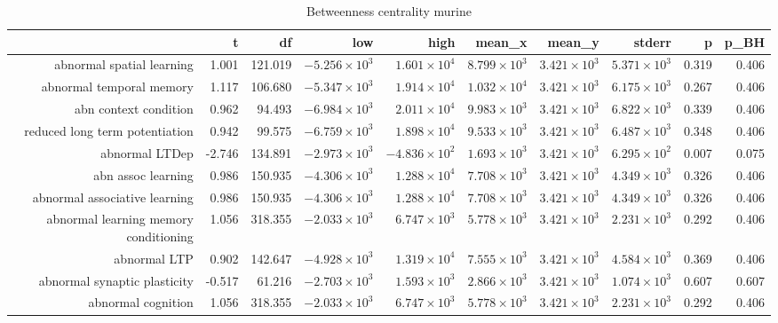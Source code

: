 \begin{table}[ht]
\centering
\begin{tabular}{rrrrrrrrrr}
  \toprule
 & t & df & low & high & mean\_x & mean\_y & stderr & p & p\_BH \\ 
  \midrule
abnormal spatial learning & 1.001 & 121.019 & $-5.256 \times 10^{3}$ & $1.601 \times 10^{4}$ & $8.799 \times 10^{3}$ & $3.421 \times 10^{3}$ & $5.371 \times 10^{3}$ & 0.319 & 0.406 \\ 
  abnormal temporal memory & 1.117 & 106.680 & $-5.347 \times 10^{3}$ & $1.914 \times 10^{4}$ & $1.032 \times 10^{4}$ & $3.421 \times 10^{3}$ & $6.175 \times 10^{3}$ & 0.267 & 0.406 \\ 
  abn context condition & 0.962 & 94.493 & $-6.984 \times 10^{3}$ & $2.011 \times 10^{4}$ & $9.983 \times 10^{3}$ & $3.421 \times 10^{3}$ & $6.822 \times 10^{3}$ & 0.339 & 0.406 \\ 
  reduced long term potentiation & 0.942 & 99.575 & $-6.759 \times 10^{3}$ & $1.898 \times 10^{4}$ & $9.533 \times 10^{3}$ & $3.421 \times 10^{3}$ & $6.487 \times 10^{3}$ & 0.348 & 0.406 \\ 
  abnormal LTDep & -2.746 & 134.891 & $-2.973 \times 10^{3}$ & $-4.836 \times 10^{2}$ & $1.693 \times 10^{3}$ & $3.421 \times 10^{3}$ & $6.295 \times 10^{2}$ & 0.007 & 0.075 \\ 
  abn assoc learning & 0.986 & 150.935 & $-4.306 \times 10^{3}$ & $1.288 \times 10^{4}$ & $7.708 \times 10^{3}$ & $3.421 \times 10^{3}$ & $4.349 \times 10^{3}$ & 0.326 & 0.406 \\ 
  abnormal associative learning & 0.986 & 150.935 & $-4.306 \times 10^{3}$ & $1.288 \times 10^{4}$ & $7.708 \times 10^{3}$ & $3.421 \times 10^{3}$ & $4.349 \times 10^{3}$ & 0.326 & 0.406 \\ 
  abnormal learning memory conditioning & 1.056 & 318.355 & $-2.033 \times 10^{3}$ & $6.747 \times 10^{3}$ & $5.778 \times 10^{3}$ & $3.421 \times 10^{3}$ & $2.231 \times 10^{3}$ & 0.292 & 0.406 \\ 
  abnormal LTP & 0.902 & 142.647 & $-4.928 \times 10^{3}$ & $1.319 \times 10^{4}$ & $7.555 \times 10^{3}$ & $3.421 \times 10^{3}$ & $4.584 \times 10^{3}$ & 0.369 & 0.406 \\ 
  abnormal synaptic plasticity & -0.517 & 61.216 & $-2.703 \times 10^{3}$ & $1.593 \times 10^{3}$ & $2.866 \times 10^{3}$ & $3.421 \times 10^{3}$ & $1.074 \times 10^{3}$ & 0.607 & 0.607 \\ 
  abnormal cognition & 1.056 & 318.355 & $-2.033 \times 10^{3}$ & $6.747 \times 10^{3}$ & $5.778 \times 10^{3}$ & $3.421 \times 10^{3}$ & $2.231 \times 10^{3}$ & 0.292 & 0.406 \\ 
   \bottomrule
\end{tabular}
\caption{Betweenness centrality murine}
\end{table}
